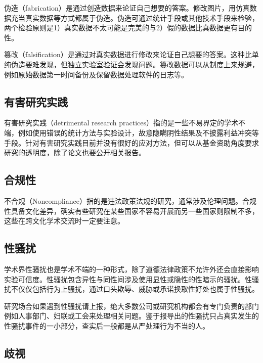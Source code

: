 \documentclass[]{tufte-book}
\begin{document}
伪造（fabrication）是通过创造数据来论证自己想要的答案。修改图片，用仿真数据充当真实数据等方式都属于伪造。伪造可通过统计手段或其他技术手段来检验，两个检验原则是1）真实数据不太可能是完美的与2）假的数据比真数据更有目的性。

篡改（falsification）是通过对真实数据进行修改来论证自己想要的答案。这种比单纯伪造要难发现，但独立实验室验证会发现问题。篡改数据可以从制度上来规避，例如原始数据第一时间备份及保留数据处理软件的日志等。

\hypertarget{ux6709ux5bb3ux7814ux7a76ux5b9eux8df5}{%
\subsection{有害研究实践}\label{ux6709ux5bb3ux7814ux7a76ux5b9eux8df5}}

有害研究实践（detrimental research practices）指的是一些不易界定的学术不端，例如使用错误的统计方法与实验设计，故意隐瞒阴性结果及不披露利益冲突等手段。针对有害研究实践目前并没有很好的应对方法，但可以从基金资助角度要求研究的透明度，除了论文也要公开相关报告。

\hypertarget{ux5408ux89c4ux6027}{%
\subsection{合规性}\label{ux5408ux89c4ux6027}}

不合规（Noncompliance）指的是违法政策法规的研究，通常涉及伦理问题。合规性具备文化差异，确实有些研究在某些国家不容易开展而另一些国家则限制不多，这些在跨文化学术交流时一定要注意。

\hypertarget{ux6027ux9a9aux6270}{%
\subsection{性骚扰}\label{ux6027ux9a9aux6270}}

学术界性骚扰也是学术不端的一种形式，除了道德法律政策不允许外还会直接影响实验可信度。性骚扰包含异性与同性间涉及使用显性或隐性的性暗示的骚扰。性骚扰不仅仅包括行为上骚扰，通过口头欺辱、威胁或承诺换取性好处也属于性骚扰。

研究场合如果遇到性骚扰请上报，绝大多数公司或研究机构都会有专门负责的部门例如人事部门、妇联或工会来处理相关问题。鉴于报导出的性骚扰只占真实发生的性骚扰事件的一小部分，查实后一般都是从严处理行为不当的人。

\hypertarget{ux6b67ux89c6}{%
\subsection{歧视}\label{ux6b67ux89c6}}
\end{document}

